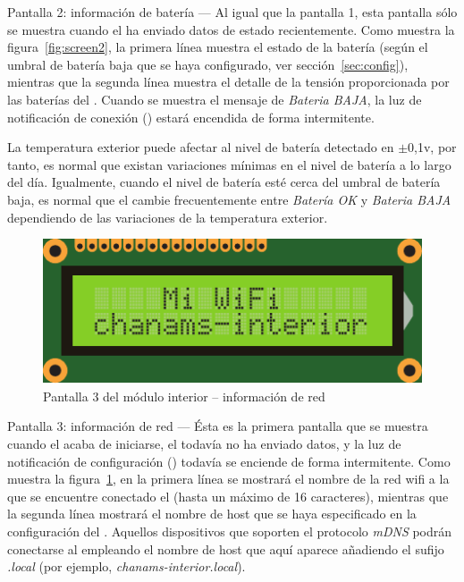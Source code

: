 \begin{descriptioncompact}
\item[Pantalla 2: información de batería] --- Al igual que la pantalla 1, esta pantalla sólo se muestra cuando el \MEE ha enviado datos de estado recientemente. Como muestra la figura~\ref{fig:screen2}, la primera línea muestra el estado de la batería (según el umbral de batería baja que se haya configurado, ver sección~\ref{sec:config}), mientras que la segunda línea muestra el detalle de la tensión proporcionada por las baterías del \MEE. Cuando se muestra el mensaje de \emph{Bateria BAJA}, la luz de notificación de conexión  () estará encendida de forma intermitente.

La temperatura exterior puede afectar al nivel de batería detectado en \mbox{$\pm$0,1v}, por tanto, es normal que existan variaciones mínimas en el nivel de batería a lo largo del día. Igualmente, cuando el nivel de batería esté cerca del umbral de batería baja, es normal que el \MIE cambie frecuentemente entre \emph{Batería OK} y \emph{Bateria BAJA} dependiendo de las variaciones de la temperatura exterior.
\attend

\begin{figure}
  \centering
  \includegraphics[width=0.6\columnwidth]{images/screen3}
  \caption{Pantalla 3 del módulo interior -- información de red}
  \label{fig:screen3}
\end{figure}


\item[Pantalla 3: información de red] --- Ésta es la primera pantalla que se muestra cuan\-do el \MIE acaba de iniciarse, el \MEE todavía no ha enviado datos, y la luz de notificación de configuración  () todavía se enciende de forma intermitente. Como muestra la figura~\ref{fig:screen3}, en la primera línea se mostrará el nombre de la red wifi a la que se encuentre conectado el \ME (hasta un máximo de 16 caracteres), mientras que la segunda línea mostrará el nombre de host que se haya especificado en la configuración del \MI. Aquellos dispositivos que soporten el protocolo \emph{mDNS} podrán conectarse al \MI empleando el nombre de host que aquí aparece añadiendo el sufijo \emph{.local} (por ejemplo, \emph{chanams-interior.local}). 


\end{descriptioncompact}
